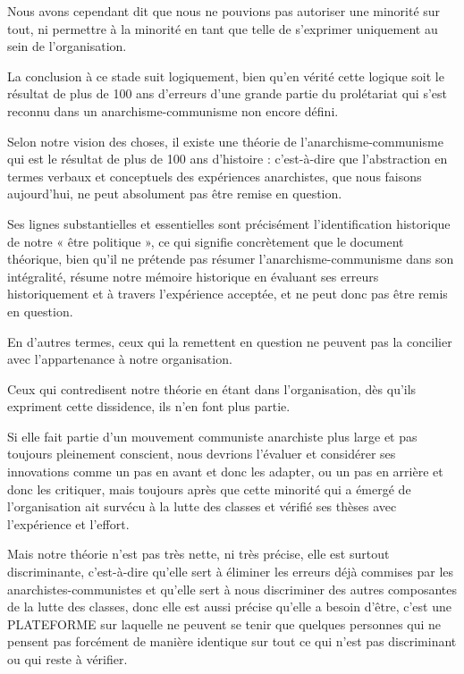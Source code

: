 Nous avons cependant dit que nous ne pouvions pas autoriser une minorité sur tout, ni permettre à la minorité en tant que telle de s'exprimer uniquement au sein de l'organisation.

La conclusion à ce stade suit logiquement, bien qu'en vérité cette logique soit le résultat de plus de 100 ans d'erreurs d'une grande partie du prolétariat qui s'est reconnu dans un anarchisme-communisme non encore défini.

Selon notre vision des choses, il existe une théorie de l'anarchisme-communisme qui est le résultat de plus de 100 ans d'histoire : c'est-à-dire que l'abstraction en termes verbaux et conceptuels des expériences anarchistes, que nous faisons aujourd'hui, ne peut absolument pas être remise en question.

Ses lignes substantielles et essentielles sont précisément l'identification historique de notre « être politique », ce qui signifie concrètement que le document théorique, bien qu'il ne prétende pas résumer l'anarchisme-communisme dans son intégralité, résume notre mémoire historique en évaluant ses erreurs historiquement et à travers l'expérience acceptée, et ne peut donc pas être remis en question.

En d'autres termes, ceux qui la remettent en question ne peuvent pas la concilier avec l'appartenance à notre organisation.

Ceux qui contredisent notre théorie en étant dans l'organisation, dès qu'ils expriment cette dissidence, ils n'en font plus partie.

Si elle fait partie d'un mouvement communiste anarchiste plus large et pas toujours pleinement conscient, nous devrions l'évaluer et considérer ses innovations comme un pas en avant et donc les adapter, ou un pas en arrière et donc les critiquer, mais toujours après que cette minorité qui a émergé de l'organisation ait survécu à la lutte des classes et vérifié ses thèses avec l'expérience et l'effort.

Mais notre théorie n'est pas très nette, ni très précise, elle est surtout discriminante, c'est-à-dire qu'elle sert à éliminer les erreurs déjà commises par les anarchistes-communistes et qu'elle sert à nous discriminer des autres composantes de la lutte des classes, donc elle est aussi précise qu'elle a besoin d'être, c'est une PLATEFORME sur laquelle ne peuvent se tenir que quelques personnes qui ne pensent pas forcément de manière identique sur tout ce qui n'est pas discriminant ou qui reste à vérifier.


